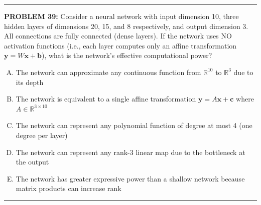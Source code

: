 \documentclass[12pt]{amsart}
\newcommand{\divider}{
  \vspace{-1em} %
  \noindent
  \raisebox{-0.15ex}{\textbullet}%
  \hspace{0.5em}%
  \rule[0.5ex]{0.95\textwidth}{1.0pt}%
  \hspace{0.5em}%
  \raisebox{-0.15ex}{\textbullet}%
  \vspace{0em} %
}
\begin{document}
{\divider


{\bf PROBLEM 39:}
%
Consider a neural network with input dimension 10, three hidden layers of dimensions 20, 15, and 8 respectively, and output dimension 3. All connections are fully connected (dense layers). If the network uses NO activation functions (i.e., each layer computes only an affine transformation $\mathbf{y} = W\mathbf{x} + \mathbf{b}$), what is the network's effective computational power?

\begin{enumerate}[(A)]
\item The network can approximate any continuous function from $\mathbb{R}^{10}$ to $\mathbb{R}^3$ due to its depth
\item The network is equivalent to a single affine transformation $\mathbf{y} = A\mathbf{x} + \mathbf{c}$ where $A \in \mathbb{R}^{3 \times 10}$
\item The network can represent any polynomial function of degree at most 4 (one degree per layer)
\item The network can represent any rank-3 linear map due to the bottleneck at the output
\item The network has greater expressive power than a shallow network because matrix products can increase rank
\end{enumerate}


\divider

}
\end{document}
